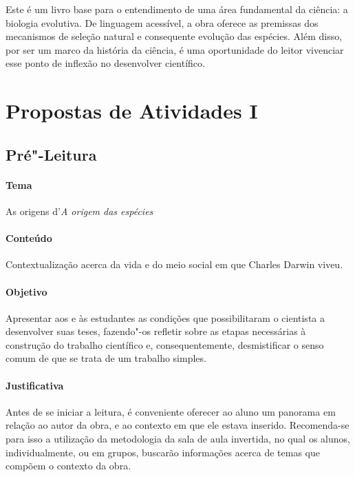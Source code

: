 \documentclass[11pt]{extarticle}
\begin{document}
Este é um livro base para o entendimento de uma área fundamental da ciência:
a biologia evolutiva. De linguagem acessível, a obra oferece as premissas dos mecanismos de seleção
natural e consequente evolução das espécies.
Além disso, por ser um marco da história da ciência, é uma oportunidade do
leitor vivenciar esse ponto de inflexão no desenvolver científico.





\section{Propostas de Atividades I}


\subsection{Pré"-Leitura}

\paragraph{Tema} As origens d'\textit{A origem das espécies}

\paragraph{Conteúdo} Contextualização acerca da vida e do meio social
em que Charles Darwin viveu.

\paragraph{Objetivo} Apresentar aos e às estudantes as condições
que possibilitaram o cientista a desenvolver suas teses, fazendo"-os
refletir sobre as etapas necessárias à construção do trabalho científico
e, consequentemente, desmistificar o senso comum de que se trata de 
um trabalho simples.

\paragraph{Justificativa} Antes de se iniciar a leitura, é conveniente oferecer ao 
aluno um panorama em
relação ao autor da obra, e ao contexto em que ele estava inserido.
Recomenda-se para isso a utilização da metodologia da sala de aula invertida,
no qual os alunos, individualmente, ou em grupos, buscarão informações acerca
de temas que compõem o contexto da obra.
\end{document}
